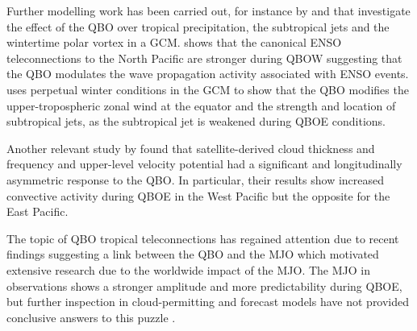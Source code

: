 Further modelling work has been carried out, for instance by \cite{garfinkel2010} and \cite{garfinkel2011} that investigate the effect of the QBO over tropical precipitation, the subtropical jets and the wintertime polar vortex in a GCM. \cite{garfinkel2010} shows that the canonical ENSO teleconnections to the North Pacific are stronger during QBOW suggesting that the QBO modulates the wave propagation activity associated with ENSO events.
 \cite{garfinkel2011} uses perpetual winter conditions in the GCM to show that the QBO modifies the upper-tropospheric zonal wind at the equator and the strength and location of subtropical jets, as the subtropical jet is weakened during QBOE conditions.


Another relevant study by \cite{liess2012} found that satellite-derived cloud thickness and frequency  and upper-level velocity potential had a significant and longitudinally asymmetric response to the QBO. In particular, their results show increased convective activity during QBOE in the West Pacific but the opposite for the East Pacific. 

The topic of QBO tropical teleconnections has regained attention due to recent findings suggesting a link between the QBO and the MJO \citep{son2017} which motivated extensive research \citep[see e.g.][]{lee2018,wang2019,martin2020jgr} due to the worldwide impact of the MJO.
 The MJO in observations shows a stronger amplitude and more predictability during QBOE, but further inspection in cloud-permitting and forecast models have not provided conclusive answers to this puzzle \citep{martin2019,martin2020jgr}. 
 
 
